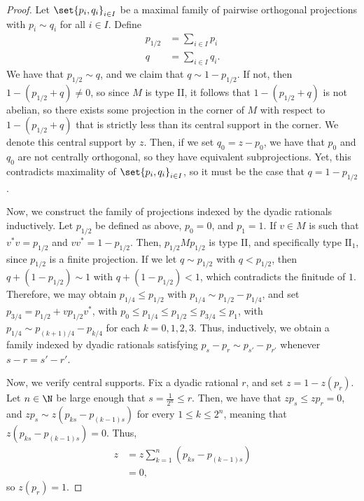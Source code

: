 \documentclass[10pt]{mypackage}
\begin{document}
\begin{proof}
  Let $\set{p_i,q_i}_{i\in I}$ be a maximal family of pairwise orthogonal projections with $p_i\sim q_i$ for all $i\in I$. Define
  \begin{align*}
    p_{1/2} &= \sum_{i\in I}p_i\\
    q &= \sum_{i\in I}q_i.
  \end{align*}
  We have that $p_{1/2}\sim q$, and we claim that $q\sim 1-p_{1/2}$. If not, then $1-\left( p_{1/2} + q \right) \neq 0$, so since $M$ is type II, it follows that $1-\left( p_{1/2} + q \right)$ is not abelian, so there exists some projection in the corner of $M$ with respect to $1-\left( p_{1/2} + q \right)$ that is strictly less than its central support in the corner. We denote this central support by $z$. Then, if we set $q_0 = z-p_0$, we have that $p_0$ and $q_0$ are not centrally orthogonal, so they have equivalent subprojections. Yet, this contradicts maximality of $\set{p_i,q_i}_{i\in I}$, so it must be the case that $q = 1-p_{1/2}$.

  Now, we construct the family of projections indexed by the dyadic rationals inductively. Let $p_{1/2}$ be defined as above, $p_0 = 0$, and $p_1 = 1$. If $v\in M$ is such that $v^{\ast}v = p_{1/2}$ and $vv^{\ast} = 1-p_{1/2}$. Then, $p_{1/2}Mp_{1/2}$ is type II, and specifically type $\text{II}_1$, since $p_{1/2}$ is a finite projection. If we let $q\sim p_{1/2}$ with $q < p_{1/2}$, then $q+ \left( 1-p_{1/2} \right) \sim 1$ with $q + \left( 1-p_{1/2} \right) < 1$, which contradicts the finitude of $1$. Therefore, we may obtain $p_{1/4}\leq p_{1/2}$ with $p_{1/4}\sim p_{1/2}-p_{1/4}$, and set $p_{3/4} = p_{1/2} + vp_{1/2}v^{\ast}$, with $p_0\leq p_{1/4}\leq p_{1/2}\leq p_{3/4}\leq p_1$, with $p_{1/4}\sim p_{\left( k+1 \right)/4}-p_{k/4}$ for each $k=0,1,2,3$. Thus, inductively, we obtain a family indexed by dyadic rationals satisfying $p_s-p_r\sim p_{s'}-p_{r'}$ whenever $s-r = s'-r'$.

  Now, we verify central supports. Fix a dyadic rational $r$, and set $z = 1-z\left( p_r \right)$. Let $n\in \N$ be large enough that $s = \frac{1}{2^{n}} \leq r$. Then, we have that $zp_s\leq zp_r = 0$, and $zp_s\sim z\left( p_{ks}-p_{\left( k-1 \right)s} \right)$ for every $1\leq k \leq 2^{n}$, meaning that $z\left( p_{ks}-p_{\left( k-1 \right)s} \right) = 0$. Thus,
  \begin{align*}
    z &= z\sum_{k=1}^{n} \left( p_{ks}-p_{\left( k-1 \right)s} \right)\\
      &= 0,
  \end{align*}
  so $z\left( p_r \right) = 1$.
\end{proof}
\end{document}
